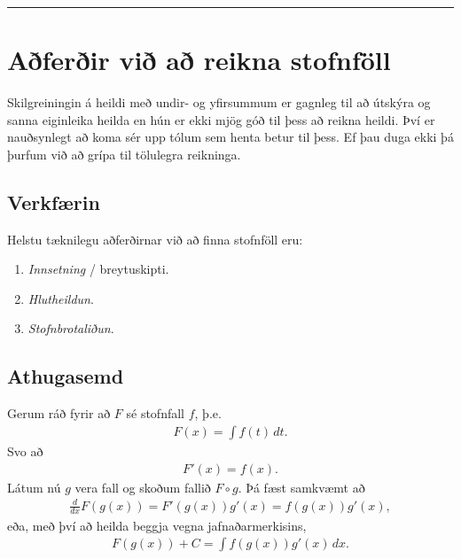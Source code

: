 \documentclass[a4paper,10pt,icelandic]{sphinxmanual}
\begin{document}
\bigskip\hrule{}\bigskip



\section{Aðferðir við að reikna stofnföll}
\label{kafli06:aferir-vi-a-reikna-stofnfoll}
Skilgreiningin á heildi með undir- og yfirsummum er gagnleg til að útskýra
og sanna eiginleika heilda en hún er ekki mjög góð til þess að reikna
heildi. Því er nauðsynlegt að koma sér upp tólum sem henta betur til þess.
Ef þau duga ekki þá þurfum við að grípa til tölulegra reikninga.


\subsection{Verkfærin}
\label{kafli06:verkfaerin}
Helstu tæknilegu aðferðirnar við að finna stofnföll eru:
\begin{enumerate}
\item {} 
\textit{Innsetning} / breytuskipti.

\item {} 
\textit{Hlutheildun}.

\item {} 
\textit{Stofnbrotaliðun}.

\end{enumerate}


\subsection{Athugasemd}
\label{kafli06:athugasemd}
Gerum ráð fyrir að \(F\) sé stofnfall \(f\), þ.e.
\begin{equation*}
\begin{split}F(x)=\int f(t)\,dt.\end{split}
\end{equation*}
Svo að
\begin{equation*}
\begin{split}F'(x)=f(x).\end{split}
\end{equation*}
Látum nú \(g\) vera fall og skoðum fallið \(F\circ g\). Þá fæst
samkvæmt {\hyperref[kafli03:kedjuregla]{}} að
\begin{equation*}
\begin{split}\frac{d}{dx}F(g(x))=F'(g(x))g'(x) = f(g(x))g'(x),\end{split}
\end{equation*}
eða, með því að heilda beggja vegna jafnaðarmerkisins,
\begin{equation*}
\begin{split}F(g(x))+C = \int f(g(x))g'(x)\,dx.\end{split}
\end{equation*}
\end{document}
